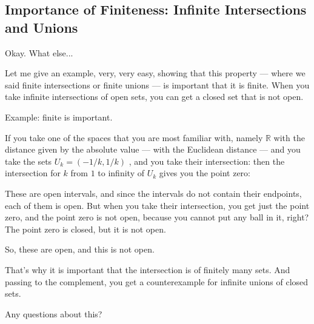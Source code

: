 \begin{hidden}
\end{hidden}

\subsection{Importance of Finiteness: Infinite Intersections and Unions}

\begin{speech}[00:23:54 - 00:25:17]
Okay. What else...

Let me give an example, very, very easy, showing that this property --- where we said finite intersections or finite unions --- is important that it is finite. When you take infinite intersections of open sets, you can get a closed set that is not open.

Example: finite is important. 

If you take one of the spaces that you are most familiar with, namely $\mathbb{R}$ with the distance given by the absolute value  --- with the Euclidean distance --- and you take the sets $U_k = (-1/k, 1/k)$ , and you take their intersection: then the intersection for $k$ from $1$ to infinity of $U_k$  gives you the point zero: 
\end{speech}

\begin{speech}[00:25:17 - 00:26:14]
These are open intervals, and since the intervals do not contain their endpoints, each of them is open. But when you take their intersection, you get just the point zero, and the point zero is not open, because you cannot put any ball in it, right? The point zero is closed, but it is not open.

So, these are open, and this is not open. 

That's why it is important that the intersection is of finitely many sets. And passing to the complement, you get a counterexample for infinite unions of closed sets.

Any questions about this?
\end{speech}

